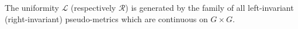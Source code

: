 The uniformity $\mathcal{L}$ (respectively $\mathcal{R}$) is generated by the family of all left-invariant (right-invariant) pseudo-metrics which are continuous on $G \times G$.
